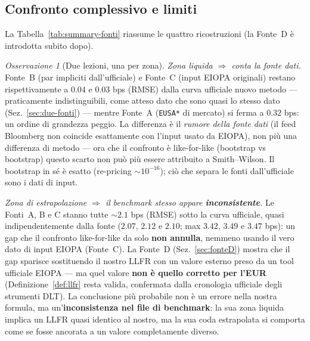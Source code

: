 \documentclass[11pt,a4paper]{article}
\theoremstyle{plain}
\theoremstyle{definition}
\theoremstyle{remark}
\newtheorem*{osservazione}{Osservazione}
\begin{document}
\subsection{Confronto complessivo e limiti}
\label{sec:confronto}

La Tabella~\ref{tab:summary-fonti} riassume le quattro ricostruzioni (la Fonte~D \`e introdotta
subito dopo).



\begin{osservazione}[Due lezioni, una per zona]
\emph{Zona liquida $\Rightarrow$ conta la fonte dati.} Fonte~B (par impliciti
dall'ufficiale) e Fonte~C (input EIOPA originali) restano rispettivamente a $0.04$ e $0.03$
bps (RMSE) dalla curva ufficiale nuovo metodo --- praticamente indistinguibili, come atteso
dato che sono quasi lo stesso dato (Sez.~\ref{sec:due-fonti}) --- mentre Fonte~A
(\texttt{EUSA*} di mercato) si ferma a $0.32$ bps: un ordine di grandezza peggio. La
differenza \`e il \emph{rumore della fonte dati} (il feed Bloomberg non coincide esattamente
con l'input usato da EIOPA), non pi\`u una differenza di metodo --- ora che il confronto \`e
like-for-like (bootstrap vs bootstrap) questo scarto non pu\`o pi\`u essere attribuito a
Smith--Wilson. Il bootstrap in s\'e \`e esatto (re-pricing $\sim 10^{-16}$); ci\`o che separa
le fonti dall'ufficiale sono i dati di input.

\emph{Zona di estrapolazione $\Rightarrow$ il benchmark stesso appare
\textbf{inconsistente}.} Le Fonti~A, B e C stanno tutte $\sim 2.1$ bps (RMSE) sotto la curva
ufficiale, quasi indipendentemente dalla fonte ($2.07$, $2.12$ e $2.10$; max $3.42$, $3.49$ e
$3.47$ bps): un gap che il confronto like-for-like da solo \textbf{non annulla}, nemmeno
usando il vero dato di input EIOPA (Fonte~C). La Fonte~D (Sez.~\ref{sec:fonteD}) mostra che
il gap sparisce sostituendo il nostro LLFR con un valore esterno preso da un tool ufficiale
EIOPA --- ma quel valore \textbf{non \`e quello corretto per l'EUR}
(Definizione~\ref{def:llfr} resta valida, confermata dalla cronologia ufficiale degli
strumenti DLT). La conclusione pi\`u probabile non \`e un errore nella nostra formula, ma
un'\textbf{inconsistenza nel file di benchmark}: la sua zona liquida implica un LLFR quasi
identico al nostro, ma la sua coda estrapolata si comporta come se fosse ancorata a un valore
completamente diverso.
\end{osservazione}
\end{document}
